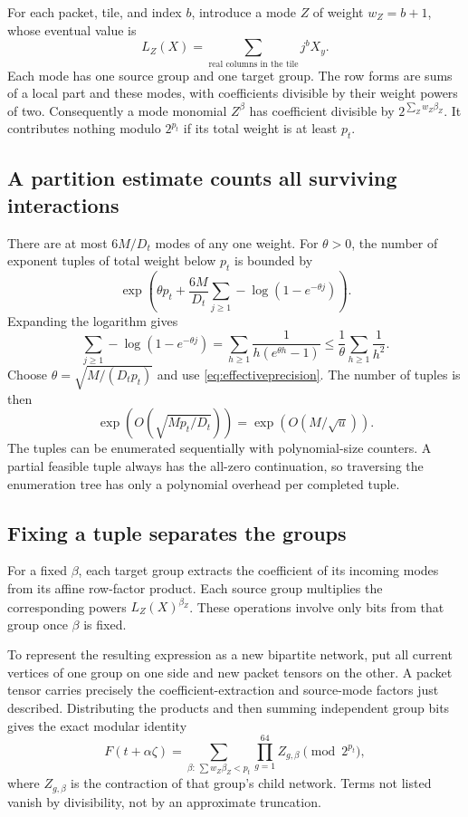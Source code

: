 \documentclass[11pt,a4paper]{article}
\numberwithin{equation}{section}
\theoremstyle{definition}
\theoremstyle{remark}
\begin{document}
For each packet, tile, and index $b$, introduce a mode $Z$ of weight
$w_Z=b+1$, whose eventual value is
\[
 L_Z(X)=\sum_{\text{real columns in the tile}}j^bX_y.
\]
Each mode has one source group and one target group. The row forms are sums
of a local part and these modes, with coefficients divisible by their
weight powers of two. Consequently a mode monomial $Z^\beta$ has coefficient
divisible by $2^{\sum_Zw_Z\beta_Z}$. It contributes nothing modulo $2^{p_t}$
if its total weight is at least $p_t$.

\subsection{A partition estimate counts all surviving interactions}
There are at most $6M/D_t$ modes of any one weight. For $\theta>0$, the number
of exponent tuples of total weight below $p_t$ is bounded by
\[
 \exp\left(\theta p_t+\frac{6M}{D_t}
                \sum_{j\ge1}-\log(1-e^{-\theta j})\right).
\]
Expanding the logarithm gives
\[
 \sum_{j\ge1}-\log(1-e^{-\theta j})
 =\sum_{h\ge1}\frac1{h(e^{\theta h}-1)}
 \le\frac1\theta\sum_{h\ge1}\frac1{h^2}.
\]
Choose $\theta=\sqrt{M/(D_tp_t)}$ and use
\eqref{eq:effectiveprecision}. The number of tuples is then
\begin{equation}\label{eq:modenumber}
 \exp(O(\sqrt{Mp_t/D_t}))=\exp(O(M/\sqrt u)).
\end{equation}
The tuples can be enumerated sequentially with polynomial-size counters.
A partial feasible tuple always has the all-zero continuation, so traversing
the enumeration tree has only a polynomial overhead per completed tuple.

\subsection{Fixing a tuple separates the groups}
For a fixed $\beta$, each target group extracts the coefficient of its
incoming modes from its affine row-factor product. Each source group
multiplies the corresponding powers $L_Z(X)^{\beta_Z}$. These operations
involve only bits from that group once $\beta$ is fixed.

To represent the resulting expression as a new bipartite network, put all
current vertices of one group on one side and new packet tensors on the
other. A packet tensor carries precisely the coefficient-extraction and
source-mode factors just described. Distributing the products and then
summing independent group bits gives the exact modular identity
\begin{equation}\label{eq:recursion}
 F(t+\alpha\zeta)
 =\sum_{\beta:\,\sum w_Z\beta_Z<p_t}
            \prod_{g=1}^{64}Z_{g,\beta}\pmod{2^{p_t}},
\end{equation}
where $Z_{g,\beta}$ is the contraction of that group's child network.
Terms not listed vanish by divisibility, not by an approximate truncation.
\end{document}
